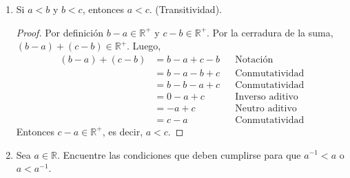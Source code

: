 \documentclass[11pt]{article}
\newcommand{\R}{\mathbb{R}}
\begin{document}
\begin{enumerate}[label=\alph*)]
    \item Si $a<b$ y $b<c$, entonces $a<c$. (Transitividad).
    \vspace{-1em}\begin{proof} 
        Por definición $b-a \in \R^+$ y $c-b \in \R^+$. Por la cerradura de la suma, $(b-a) + (c-b) \in \R^+$. Luego, \begin{align*}
        (b-a) + (c-b) &= b - a + c -b && \text{Notación}\\
        &= b-a -b+c && \text{Conmutatividad}\\
        &= b-b -a+c && \text{Conmutatividad}\\
        &= 0 - a +c && \text{Inverso aditivo}\\
        &= -a +c && \text{Neutro aditivo}\\
        &= c-a && \text{Conmutatividad}
    \end{align*} Entonces $c-a \in \R^+$, es decir, $a<c$.    
    \end{proof} \vspace{-1em}

    \item Sea $a\in \R$. Encuentre las condiciones que deben cumplirse para que $a^{-1}<a$ o $a<a^{-1}$.
    

\end{enumerate}
\end{document}
